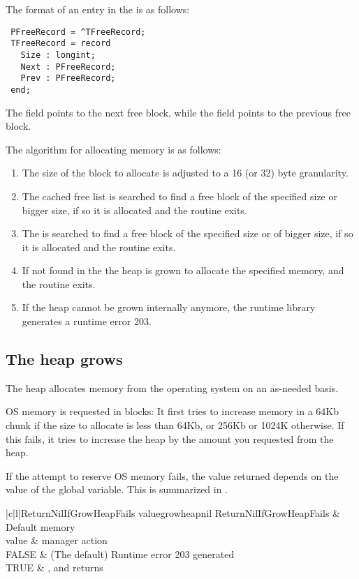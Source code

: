 The format of an entry in the  is as follows:

\begin{verbatim}
 PFreeRecord = ^TFreeRecord;
 TFreeRecord = record
   Size : longint;
   Next : PFreeRecord;
   Prev : PFreeRecord;
 end;

\end{verbatim}

The  field points to the next free block, while
the  field points to the previous free block.

The algorithm for allocating memory is as follows:

\begin{enumerate}
\item The size of the block to allocate is adjusted to a 16 (or 32) byte granularity.
\item The cached free list is searched to find a free block of the specified
 size or bigger size, if so it is allocated and the routine exits.
\item The  is searched to find a free block of the specified size
or of bigger size, if so it is allocated and the routine exits.
\item If not found in the  the heap is grown to allocate the
specified memory, and the routine exits.
\item If the heap cannot be grown internally anymore, the runtime library 
generates a runtime error 203.
\end{enumerate}


\subsection{The heap grows}
The heap allocates memory from the operating system on an as-needed basis.

OS memory is requested in blocks: It first tries to increase memory in a 64Kb 
chunk if the size to allocate is less than 64Kb, or 256Kb or 1024K otherwise.
If this fails, it tries to increase the heap by the amount you requested
from the heap.

If the attempt to reserve OS memory fails, the value returned depends on the
value of the  global variable. This is summarized
in .

\begin{FPCltable}{|c|l|}{ReturnNilIfGrowHeapFails value}{growheapnil}
\hline
  ReturnNilIfGrowHeapFails & Default memory \\
    value                  & manager action \\
\hline  
     FALSE	        & (The default) Runtime error 203 generated \\
     TRUE 		& ,  and  returns  \\
\hline
\end{FPCltable}

